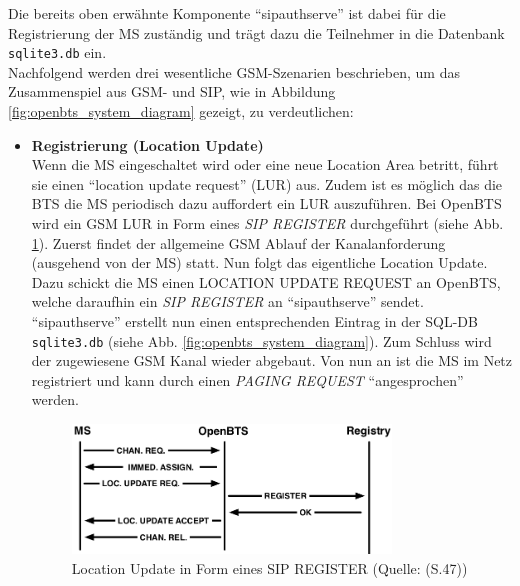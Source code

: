 Die bereits oben erwähnte Komponente "`sipauthserve"' ist dabei für die Registrierung der MS zuständig und trägt dazu  die Teilnehmer in die Datenbank \verb|sqlite3.db| ein.\\ 
Nachfolgend werden drei wesentliche GSM-Szenarien beschrieben, um das Zusammenspiel aus GSM- und SIP, wie in Abbildung \ref{fig:openbts_system_diagram} gezeigt, zu verdeutlichen:
\begin{itemize}
\item \textbf{Registrierung (Location Update)}\\
Wenn die MS eingeschaltet wird oder eine neue Location Area betritt, führt sie einen "`location update request"' (LUR) aus. Zudem ist es möglich das die BTS die MS periodisch dazu auffordert ein LUR auszuführen. Bei OpenBTS wird ein GSM LUR in Form eines \textit{SIP REGISTER} durchgeführt (siehe Abb. \ref{fig:openbts_registration}). Zuerst findet der allgemeine GSM Ablauf der Kanalanforderung (ausgehend von der MS) statt. Nun folgt das eigentliche Location Update. Dazu schickt die MS einen LOCATION UPDATE REQUEST an OpenBTS, welche daraufhin ein \textit{SIP REGISTER} an "`sipauthserve"' sendet. "`sipauthserve"' erstellt nun einen entsprechenden Eintrag in der SQL-DB \verb|sqlite3.db| (siehe Abb. \ref{fig:openbts_system_diagram}). Zum Schluss wird der zugewiesene GSM Kanal wieder abgebaut. Von nun an ist die MS im Netz registriert und kann durch einen \textit{PAGING REQUEST} "`angesprochen"' werden.
\begin{figure}[h]
	\centering
		\includegraphics[width=0.80\textwidth]{img/openbts_registration.png}
	\caption{Location Update in Form eines SIP REGISTER (Quelle: \cite{bib:openbtsmanual}(S.47))}
	\label{fig:openbts_registration}
\end{figure}
\end{itemize}
\newpage
